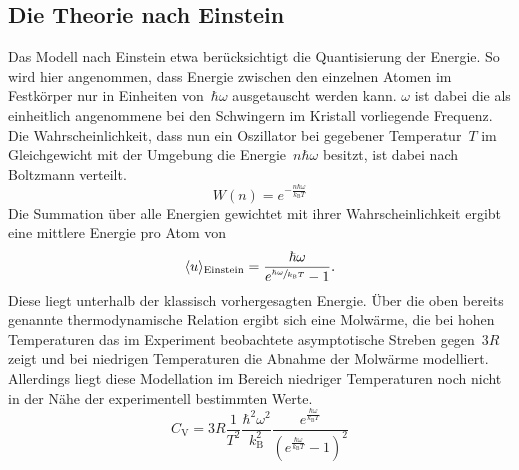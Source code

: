 \subsection{Die Theorie nach Einstein}
%
Das Modell nach Einstein etwa berücksichtigt die Quantisierung der Energie. So
wird hier angenommen, dass Energie zwischen den einzelnen Atomen im Festkörper
nur in Einheiten von~$\hbar\omega$ ausgetauscht werden kann. $\omega$ ist dabei
die als einheitlich angenommene bei den Schwingern im Kristall vorliegende
Frequenz. Die Wahrscheinlichkeit, dass nun ein Oszillator bei gegebener
Temperatur~$T$ im Gleichgewicht mit der Umgebung die Energie~$n\hbar\omega$
besitzt, ist dabei nach Boltzmann verteilt.
%
\begin{equation}
  W(n)=e^{-\frac{n\hbar\omega}{k_{\mathrm{B}}T}}
\end{equation}
%
Die Summation über alle Energien gewichtet mit ihrer Wahrscheinlichkeit ergibt
eine mittlere Energie pro Atom von
%
\begin{equation}
  \langle u\rangle_\text{Einstein}=\frac{\hbar\omega}{e^{\sfrac{\hbar\omega}{k_{\mathrm{B}}T}}-1}.
\end{equation}
%
Diese liegt unterhalb der klassisch vorhergesagten Energie. Über die oben
bereits genannte thermodynamische Relation ergibt sich eine Molwärme, die bei
hohen Temperaturen das im Experiment beobachtete asymptotische Streben
gegen~$3R$ zeigt und bei niedrigen Temperaturen die Abnahme der Molwärme
modelliert. Allerdings liegt diese Modellation im Bereich niedriger Temperaturen
noch nicht in der Nähe der experimentell bestimmten Werte.
%
\begin{equation}
  C_{\mathrm{V}}=3R\frac{1}{T^2}\frac{\hbar^2\omega^2}{k_{\mathrm{B}}^2}\frac{e^{\frac{\hbar\omega}{k_{\mathrm{B}}T}}}{(e^{\frac{\hbar\omega}{k_{\mathrm{B}}T}}-1)^2}
\end{equation}
%
